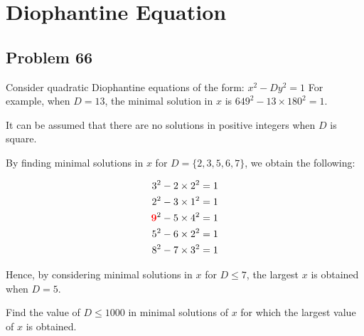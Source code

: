 \chapter{Diophantine Equation}
\section{Problem 66}
Consider quadratic Diophantine equations of the form:
$x^2 - Dy^2 = 1$
For example, when $D=13$, the minimal solution in $x$ is $649^2 - 13 \times 180^2 = 1$.

It can be assumed that there are no solutions in positive integers when $D$ is square.

By finding minimal solutions in $x$ for $D = \{2, 3, 5, 6, 7\}$, we obtain the following:

\begin{align*}
3^2 - 2 \times 2^2 &= 1\\
2^2 - 3 \times 1^2 &= 1\\
{\color{red}{\mathbf 9}}^2 - 5 \times 4^2 &= 1\\
5^2 - 6 \times 2^2 &= 1\\
8^2 - 7 \times 3^2 &= 1
\end{align*}

Hence, by considering minimal solutions in
$x$ for $D \le 7$, the largest $x$ is obtained when $D = 5$.

Find the value of $D \le 1000$ in minimal solutions of $x$ for which the largest value of $x$ is obtained.
